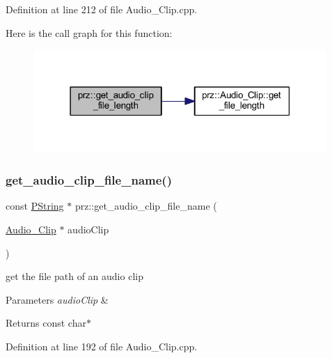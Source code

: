 Definition at line 212 of file Audio\+\_\+\+Clip.\+cpp.

Here is the call graph for this function\+:
\nopagebreak
\begin{figure}[H]
\begin{center}
\leavevmode
\includegraphics[width=316pt]{namespaceprz_aa29f4f6bfb3146f21ba0e8e9a446fc11_cgraph}
\end{center}
\end{figure}
\mbox{\label{namespaceprz_a1e806a9ab1fe1af94256d0e0efccd999}} 
\subsubsection{\texorpdfstring{get\_audio\_clip\_file\_name()}{get\_audio\_clip\_file\_name()}}
{\footnotesize\ttfamily const \mbox{\hyperlink{classprz_1_1_p_string}{P\+String}} $\ast$ prz\+::get\+\_\+audio\+\_\+clip\+\_\+file\+\_\+name (\begin{DoxyParamCaption}\item[{\mbox{\hyperlink{classprz_1_1_audio___clip}{Audio\+\_\+\+Clip}} $\ast$}]{audio\+Clip }\end{DoxyParamCaption})}



get the file path of an audio clip 


\begin{DoxyParams}{Parameters}
{\em audio\+Clip} & \\
\hline
\end{DoxyParams}
\begin{DoxyReturn}{Returns}
const char$\ast$ 
\end{DoxyReturn}


Definition at line 192 of file Audio\+\_\+\+Clip.\+cpp.


